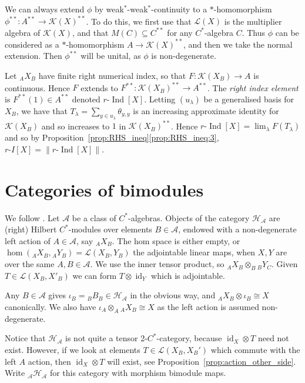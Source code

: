 \documentclass[a4paper,11pt]{article}
\theoremstyle{plain}
\theoremstyle{remark}
\newcommand{\mc}[1]{\mathcal{#1}}
\newcommand{\id}{\operatorname{id}}
\newcommand{\ind}{\operatorname{Ind}}
\begin{document}
We can always extend $\phi$ by weak$^*$-weak$^*$-continuity to a $*$-homomorphism $\phi^{**} \colon A^{**} \to \mc K(X)^{**}$.  To do this, we first use that $\mc L(X)$ is the multiplier algebra of $\mc K(X)$, and that $M(C) \subseteq C^{**}$ for any $C^*$-algebra $C$.  Thus $\phi$ can be considered as a $*$-homomorphism $A \to \mc K(X)^{**}$, and then we take the normal extension.  Then $\phi^{**}$ will be unital, as $\phi$ is non-degenerate.

Let ${}_AX_B$ have finite right numerical index, so that $F\colon \mc K(X_B) \to A$ is continuous.  Hence $F$ extends to $F^{**} \colon \mc K(X_B)^{**} \to A^{**}$.  The \emph{right index element} is $F^{**}(1) \in A^{**}$ denoted $r\text{-}\ind[X]$.  Letting $(u_\lambda)$ be a generalised basis for $X_B$, we have that $T_\lambda = \sum_{y\in u_\lambda} \theta_{y,y}$ is an increasing approximate identity for $\mc K(X_B)$ and so increases to $1$ in $\mc K(X_B)^{**}$.  Hence $r\text{-}\ind[X] = \lim_\lambda F(T_\lambda)$ and so by Proposition~\ref{prop:RHS_ineq}\ref{prop:RHS_ineq:3}, $r\text{-}I[X] = \| r\text{-}\ind[X] \|$.




\section{Categories of bimodules}

We follow \cite[Section~4]{KPW_JonesIndexTheory}.  Let $\mc A$ be a class of $C^*$-algebras.  Objects of the category $\mc H_{\mc A}$ are (right) Hilbert $C^*$-modules over elements $B\in\mc A$, endowed with a non-degenerate left action of $A\in\mc A$, say ${}_A X_B$.  The hom space is either empty, or $\hom({}_AX_B, {}_AY_B) = \mc L(X_B,Y_B)$ the adjointable linear maps, when $X,Y$ are over the same $A,B\in\mc A$.  We use the inner tensor product, so ${}_A X_B \otimes_B {}_B Y_C$.  Given $T\in\mc L(X_B, X'_B)$ we can form $T\otimes\id_Y$ which is adjointable.

Any $B\in\mc A$ gives $\iota_B = {}_B B_B \in \mc H_{\mc A}$ in the obvious way, and ${}_AX_B \otimes \iota_B \cong X$ canonically.  We also have $\iota_A \otimes_A {}_AX_B \cong X$ as the left action is assumed non-degenerate.

Notice that $\mc H_{\mc A}$ is not quite a tensor 2-$C^*$-category, because $\id_X\otimes T$ need not exist.  However, if we look at elements $T\in\mc L(X_B,X_B')$ which commute with the left $A$ action, then $\id_X\otimes T$ will exist, see Proposition~\ref{prop:action_other_side}.  Write ${}_{\mc A}\mc H_{\mc A}$ for this category with morphism bimodule maps.
\end{document}

